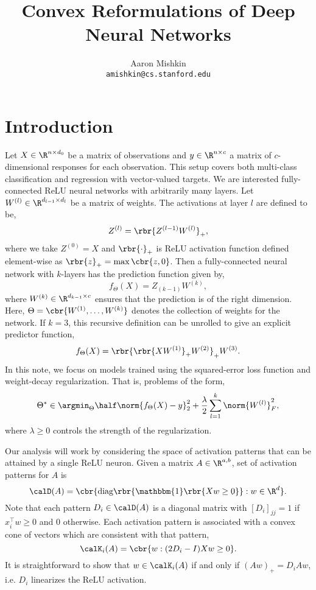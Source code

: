 \documentclass{article}
\title{Convex Reformulations of Deep Neural Networks}
\author{Aaron Mishkin\\ \texttt{amishkin@cs.stanford.edu}}
\date{}
\newcommand{\Wone}{W^{(1)}}
\newcommand{\Wl}{W^{(l)}}
\newcommand{\Zl}{Z^{(l)}}
\newcommand{\Zzero}{Z^{(0)}}
\begin{document}
\maketitle

\section{Introduction}

Let \( X \in \R^{n \times d_0} \) be a matrix of observations and \( y \in
\R^{n \times c} \) a matrix of \( c \)-dimensional responses for each
observation.
This setup covers both multi-class classification and regression with
vector-valued targets.
We are interested fully-connected ReLU neural networks with arbitrarily many
layers.
Let \( \Wl \in \R^{d_{l-1} \times d_l} \) be a matrix of weights.
The activations at layer $l$ are defined to be,
\begin{equation}
    \Zl = \rbr{Z^{(l-1)} \Wl}_+,
\end{equation}
where we take \( \Zzero = X \) and \(
\rbr{\cdot}_+ \) is ReLU activation function defined element-wise as \(
\rbr{z}_+ = \max\cbr{z, 0} \).
Then a fully-connected neural network with \( k \)-layers has the prediction
function given by,
\begin{equation}
    f_\Theta(X) = Z_{(k-1)}
    W^{(k)},
\end{equation}
where \( W^{(k)} \in \R^{d_{k-1} \times c} \) ensures
that the prediction is of the right dimension.
Here, \( \Theta = \cbr{\Wone, \ldots, W^{(k)}} \) denotes the collection of
weights for the network.
If \( k = 3 \), this recursive definition can be unrolled to give an
explicit predictor function,
\begin{equation}
    f_\Theta(X) = \rbr{\rbr{X W^{(1)}}_+ W^{(2)}}_+ W^{(3)}.
\end{equation}
In this note, we focus on models trained using the squared-error loss function
and weight-decay regularization.
That is, problems of the form,
\begin{equation}
    \Theta^* \in \argmin_{\Theta} \half \norm{f_\Theta(X) - y}_2^2 +
    \frac{\lambda}{2} \sum_{l=1}^k \norm{\Wl}_F^2,
\end{equation}
where \( \lambda \geq 0 \) controls the strength of the regularization.

Our analysis will work by considering the space of activation patterns that
can be attained by a single ReLU neuron.
Given a matrix \( A \in \R^{a, b} \), set of activation patterns for \( A \) is
\begin{equation}
    \calD(A) = \cbr{ \text{diag}\rbr{\mathbbm{1}\rbr{ X w \geq 0}}: w \in \R^d }.
\end{equation}
Note that each pattern \( D_i \in \calD(A) \) is a diagonal matrix with \(
[D_i]_{jj} = 1 \) if \( x_i^\top w \geq 0 \) and \( 0 \) otherwise.
Each activation pattern is associated with a convex cone of vectors which
are consistent with that pattern,
\begin{equation}
    \calK_i(A) = \cbr{w : (2D_i - I) X w \geq 0 }.
\end{equation}
It is straightforward to show that \( w \in \calK_i(A) \) if and only if \(
(Aw)_+ = D_i A w \), i.e. \( D_i \) linearizes the ReLU activation.
\end{document}
